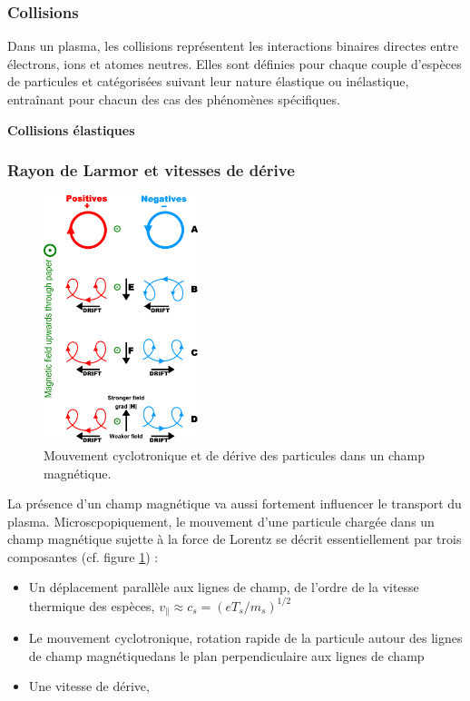 			\subsubsection{Collisions}
			Dans un plasma, les collisions représentent les interactions binaires
			directes entre électrons, ions et atomes neutres. Elles sont
			définies pour chaque couple d'espèces de particules et catégorisées suivant
			leur nature élastique ou inélastique, entraînant pour chacun des cas des
			phénomènes spécifiques.
			
			\textbf{Collisions élastiques}
			
			\subsubsection{Rayon de Larmor et vitesses de dérive}
			\begin{figure}
    			\vspace{-5pt}
    			\hspace{20pt}\includegraphics[width=0.40\textwidth]{figures/particleDrifts.png}
    			\hspace{20pt}\caption{Mouvement cyclotronique et de dérive des particules
    			dans un champ magnétique.}\label{particleDrifts}
  				 \vspace{-20pt}
			\end{figure}
			La présence d'un champ magnétique va aussi fortement influencer le transport
			du plasma. Microscpopiquement, le mouvement d'une particule chargée dans un
			champ magnétique sujette à la force de Lorentz se décrit essentiellement par trois
			composantes (cf. figure \ref{particleDrifts}) :
			
			
			\begin{itemize}
			\item Un déplacement parallèle aux lignes de champ, de l'ordre de la vitesse
			thermique des espèces, $v_\parallel\approx c_s=(eT_s/m_s)^{1/2}$
			\item Le mouvement cyclotronique, rotation rapide de la particule
			autour des lignes de champ magnétiquedans le plan perpendiculaire aux lignes
			de champ
			\item Une vitesse de dérive, 
			\end{itemize}
			\
			
